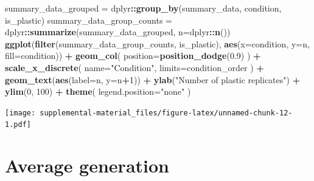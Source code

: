 \documentclass[]{book}
\newenvironment{Shaded}{\begin{snugshade}}{\end{snugshade}}
\newcommand{\DataTypeTok}[1]{\textcolor[rgb]{0.13,0.29,0.53}{#1}}
\newcommand{\DecValTok}[1]{\textcolor[rgb]{0.00,0.00,0.81}{#1}}
\newcommand{\FloatTok}[1]{\textcolor[rgb]{0.00,0.00,0.81}{#1}}
\newcommand{\KeywordTok}[1]{\textcolor[rgb]{0.13,0.29,0.53}{\textbf{#1}}}
\newcommand{\NormalTok}[1]{#1}
\newcommand{\OperatorTok}[1]{\textcolor[rgb]{0.81,0.36,0.00}{\textbf{#1}}}
\newcommand{\StringTok}[1]{\textcolor[rgb]{0.31,0.60,0.02}{#1}}
\begin{document}
\begin{Shaded}
\begin{Highlighting}[]
\NormalTok{summary_data_grouped =}\StringTok{ }\NormalTok{dplyr}\OperatorTok{::}\KeywordTok{group_by}\NormalTok{(summary_data, condition, is_plastic)}
\NormalTok{summary_data_group_counts =}\StringTok{ }\NormalTok{dplyr}\OperatorTok{::}\KeywordTok{summarize}\NormalTok{(summary_data_grouped, }\DataTypeTok{n=}\NormalTok{dplyr}\OperatorTok{::}\KeywordTok{n}\NormalTok{())}
\KeywordTok{ggplot}\NormalTok{(}\KeywordTok{filter}\NormalTok{(summary_data_group_counts, is_plastic), }\KeywordTok{aes}\NormalTok{(}\DataTypeTok{x=}\NormalTok{condition, }\DataTypeTok{y=}\NormalTok{n, }\DataTypeTok{fill=}\NormalTok{condition)) }\OperatorTok{+}
\StringTok{  }\KeywordTok{geom_col}\NormalTok{(}
    \DataTypeTok{position=}\KeywordTok{position_dodge}\NormalTok{(}\FloatTok{0.9}\NormalTok{)}
\NormalTok{  ) }\OperatorTok{+}
\StringTok{  }\KeywordTok{scale_x_discrete}\NormalTok{(}
    \DataTypeTok{name=}\StringTok{"Condition"}\NormalTok{,}
    \DataTypeTok{limits=}\NormalTok{condition_order}
\NormalTok{  ) }\OperatorTok{+}
\StringTok{  }\KeywordTok{geom_text}\NormalTok{(}\KeywordTok{aes}\NormalTok{(}\DataTypeTok{label=}\NormalTok{n, }\DataTypeTok{y=}\NormalTok{n}\OperatorTok{+}\DecValTok{1}\NormalTok{)) }\OperatorTok{+}
\StringTok{  }\KeywordTok{ylab}\NormalTok{(}\StringTok{"Number of plastic replicates"}\NormalTok{) }\OperatorTok{+}
\StringTok{  }\KeywordTok{ylim}\NormalTok{(}\DecValTok{0}\NormalTok{, }\DecValTok{100}\NormalTok{) }\OperatorTok{+}
\StringTok{  }\KeywordTok{theme}\NormalTok{(}
    \DataTypeTok{legend.position=}\StringTok{"none"}
\NormalTok{  )}
\end{Highlighting}
\end{Shaded}

\texttt{[image: supplemental-material\_files/figure-latex/unnamed-chunk-12-1.pdf]}

\hypertarget{average-generation}{%
\section{Average generation}\label{average-generation}}
\end{document}
